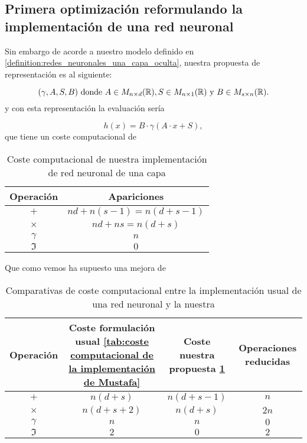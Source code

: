 \subsection*{Primera optimización reformulando la implementación de una red neuronal}

Sin embargo de acorde a nuestro modelo definido en \ref{definition:redes_neuronales_una_capa_oculta}, nuestra propuesta de representación es al siguiente: 

\begin{equation}
    (\gamma, A, S, B) 
    \text{ donde } 
    A \in M_{n \times d}(\mathbb{R}), 
    S\in M_{n \times 1}(\mathbb{R}) 
    \text{ y }
    B \in M_{s \times n}(\mathbb{R}).
\end{equation}
y con esta representación la evaluación sería

\begin{equation}
    h(x) =  B \cdot
        \gamma \left( 
            A
            \cdot 
            x
            + S
        \right),
\end{equation}
que tiene un coste computacional de 
\begin{table}[H]
    \begin{center}
    \begin{tabular}{| c | c |}
    \hline
    Operación & Apariciones  \\ \hline
    $+$ & $nd+n(s-1) = n(d+s-1)$  \\
    $\times$ & $nd+ns = n(d+s)$  \\
    $\gamma$ & $n$  \\
    $\mathfrak{I}$ & $0$  \\
    \hline
    \end{tabular}
    \caption{Coste computacional de nuestra implementación de red neuronal de una capa}
    \label{tab:coste computacional nuestr modelo red neuronal}
    \end{center}
\end{table}

Que como vemos ha supuesto una mejora de 

\begin{table}[H]
    \begin{center}
    \begin{tabular}{| c | c | c | c |}
    \hline
    Operación 
    & Coste formulación usual \ref{tab:coste computacional de la implementación de Mustafa}
    & Coste nuestra propuesta \ref{tab:coste computacional nuestr modelo red neuronal} 
    & Operaciones reducidas  \\ \hline
    $+$ & $n(d+s)$ & $n(d+s-1)$ & $n$\\
    $\times$ & $n(d+s+2)$ & $n(d+s)$  & $2n$\\
    $\gamma$ & $n$  & $n$  & $0$ \\
    $\mathfrak{I}$  & $2$ & $0$ & $2$ \\
    \hline
    \end{tabular}
    \caption{Comparativas de coste computacional entre la implementación usual de una red neuronal y la nuestra}
    \label{tab:comparativas coste red neuronal }
    \end{center}
\end{table}

